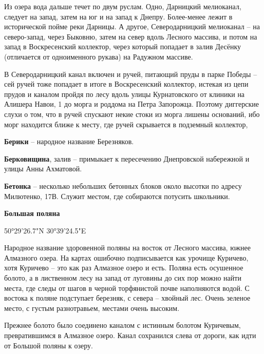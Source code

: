 Из озера вода дальше течет по двум руслам. Одно, Дарницкий мелиоканал, следует на запад, затем на юг и на запад к Днепру. Более-менее лежит в исторической пойме реки Дарницы. А другое, Северодарницкий мелиоканал – на северо-запад, через Быковню, затем на север вдоль Лесного массива, и потом на запад в Воскресенский коллектор, через который попадает в залив Десёнку (отличается от одноименного рукава) на Радужном массиве. 

В Северодарницкий канал включен и ручей, питающий пруды в парке Победы – сей ручей тоже попадает в итоге в Воскресенский коллектор, истекая из цепи прудов и каналом пройдя по лесу вдоль улицы Курнатовского от клиники на Алишера Навои, 1 до морга и роддома на Петра Запорожца. Поэтому диггерские слухи о том, что в ручей спускают некие стоки из морга лишены оснований, ибо морг находится ближе к месту, где ручей скрывается в подземный коллектор, \\

\medskip

\textbf{Берики} – народное название Березняков.\\

\medskip

\textbf{Берковищина}, залив – примыкает к пересечению Днепровской набережной и 
улицы Анны Ахматовой.\\

\medskip

\textbf{Бетонка} – несколько небольших бетонных блоков около высотки по адресу Милютенко, 17В. Служит местом, где собираются потусить школьники.\\

\medskip

\textbf{Большая поляна}

50°29'26.7"N 30°39'24.5"E

Народное название здоровенной поляны на восток от Лесного массива, южнее Алмазного озера. На картах ошибочно подписывается как урочище Куричево, хотя Куричево – это как раз Алмазное озеро и есть. Поляна есть осушенное болото, а в лиственном лесу на запад от луговины до сих пор можно найти места, где следы от шагов в черной торфянистой почве наполняются водой. С востока к поляне подступает березняк, с севера – хвойный лес. Очень зеленое место, с густым разнотравьем, местами очень высоким.

Прежнее болото было соединено каналом с истинным болотом Куричевым, превратившимся в Алмазное озеро. Канал сохранился слева от дороги, как идти от Большой поляны к озеру.

